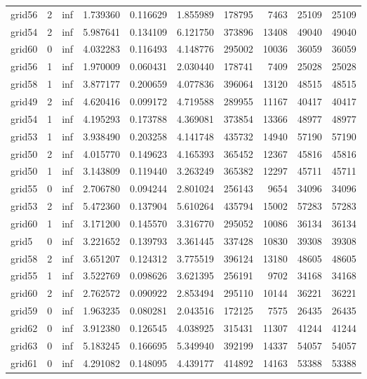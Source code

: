 \begin{longtable}{|l|r|r|r|r|r|r|r|r|r|}
grid56 & 2 & inf & 1.739360 & 0.116629 & 1.855989 & 178795 & 7463 & 25109 & 25109 \\
grid54 & 2 & inf & 5.987641 & 0.134109 & 6.121750 & 373896 & 13408 & 49040 & 49040 \\
grid60 & 0 & inf & 4.032283 & 0.116493 & 4.148776 & 295002 & 10036 & 36059 & 36059 \\
grid56 & 1 & inf & 1.970009 & 0.060431 & 2.030440 & 178741 & 7409 & 25028 & 25028 \\
grid58 & 1 & inf & 3.877177 & 0.200659 & 4.077836 & 396064 & 13120 & 48515 & 48515 \\
grid49 & 2 & inf & 4.620416 & 0.099172 & 4.719588 & 289955 & 11167 & 40417 & 40417 \\
grid54 & 1 & inf & 4.195293 & 0.173788 & 4.369081 & 373854 & 13366 & 48977 & 48977 \\
grid53 & 1 & inf & 3.938490 & 0.203258 & 4.141748 & 435732 & 14940 & 57190 & 57190 \\
grid50 & 2 & inf & 4.015770 & 0.149623 & 4.165393 & 365452 & 12367 & 45816 & 45816 \\
grid50 & 1 & inf & 3.143809 & 0.119440 & 3.263249 & 365382 & 12297 & 45711 & 45711 \\
grid55 & 0 & inf & 2.706780 & 0.094244 & 2.801024 & 256143 & 9654 & 34096 & 34096 \\
grid53 & 2 & inf & 5.472360 & 0.137904 & 5.610264 & 435794 & 15002 & 57283 & 57283 \\
grid60 & 1 & inf & 3.171200 & 0.145570 & 3.316770 & 295052 & 10086 & 36134 & 36134 \\
grid5 & 0 & inf & 3.221652 & 0.139793 & 3.361445 & 337428 & 10830 & 39308 & 39308 \\
grid58 & 2 & inf & 3.651207 & 0.124312 & 3.775519 & 396124 & 13180 & 48605 & 48605 \\
grid55 & 1 & inf & 3.522769 & 0.098626 & 3.621395 & 256191 & 9702 & 34168 & 34168 \\
grid60 & 2 & inf & 2.762572 & 0.090922 & 2.853494 & 295110 & 10144 & 36221 & 36221 \\
grid59 & 0 & inf & 1.963235 & 0.080281 & 2.043516 & 172125 & 7575 & 26435 & 26435 \\
grid62 & 0 & inf & 3.912380 & 0.126545 & 4.038925 & 315431 & 11307 & 41244 & 41244 \\
grid63 & 0 & inf & 5.183245 & 0.166695 & 5.349940 & 392199 & 14337 & 54057 & 54057 \\
grid61 & 0 & inf & 4.291082 & 0.148095 & 4.439177 & 414892 & 14163 & 53388 & 53388 \\

\end{longtable}
